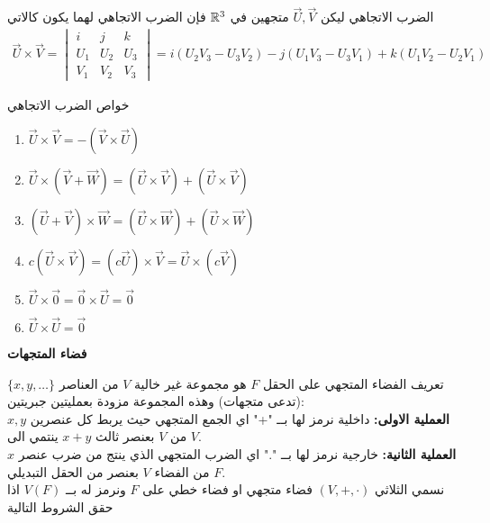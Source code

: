 \begin{frame}
	
	\pause
	\begin{exampleblock}{الضرب الاتجاهي}
		ليكن $\vec{U}, \vec{V}$ متجهين في $\mathbb{R}^3$ فإن الضرب الاتجاهي لهما يكون كالاتي
		\begin{align*}
			\vec{U}\times\vec{V}  = 
			\begin{vmatrix}
				i & j & k\\
				U_1 & U_2 & U_3\\
				V_1 & V_2 & V_3
			\end{vmatrix}= i(U_2V_3 - U_3V_2 ) -j(U_1V_3 - U_3V_1) + k(U_1V_2 - U_2V_1)
		\end{align*}
	\end{exampleblock}
	
	\pause
\begin{exampleblock}{خواص الضرب الاتجاهي}
		\begin{english}
		\begin{enumerate}
			\item $\vec{U}\times\vec{V} = -(\vec{V}\times\vec{U})$
			\item $\vec{U}\times(\vec{V} + \vec{W}) = (\vec{U}\times\vec{V}) + (\vec{U}\times\vec{V})$
			\item $(\vec{U}+\vec{V})\times\vec{W} = (\vec{U}\times\vec{W}) + (\vec{U}\times\vec{W})$
			\item $c(\vec{U}\times\vec{V}) = (c\vec{U})\times\vec{V} = \vec{U}\times(c
			\vec{V})$
			\item $\vec{U}\times\vec{0} = \vec{0}\times\vec{U} = \vec{0}$
			\item $\vec{U}\times\vec{U} = \vec{0}$
		\end{enumerate}
	\end{english}
\end{exampleblock}
\end{frame}

\begin{frame}
	\begin{center}
		\Huge
		\textbf{فضاء المتجهات}
	\end{center}
\end{frame}

\begin{frame}
	
	\pause
	\begin{exampleblock}{تعريف}
		الفضاء المتجهي على الحقل $F$ هو مجموعة غير خالية $V$ من العناصر $\{x, y, \dots\}$ (تدعى متجهات) وهذه المجموعة مزودة بعمليتين جبريتين:\\
		\noindent
		\textbf{العملية الاولى:} داخلية نرمز لها بــ "+" اي الجمع المتجهي حيث يربط كل عنصرين $x, y$ من $V$ بعنصر ثالث $x+y$ ينتمي الى $V$.\\
		\noindent
		\textbf{العملية الثانية:} خارجية نرمز لها بــ "." اي الضرب المتجهي الذي ينتج من ضرب عنصر $x$ من الفضاء $V$ بعنصر من الحقل التبديلي $F$.\\
		\noindent
		نسمي الثلاثي $(V, +, \cdot)$ فضاء متجهي او فضاء خطي على $F$ ونرمز له بــ $V(F)$ اذا حقق الشروط التالية
	\end{exampleblock}
\end{frame}

